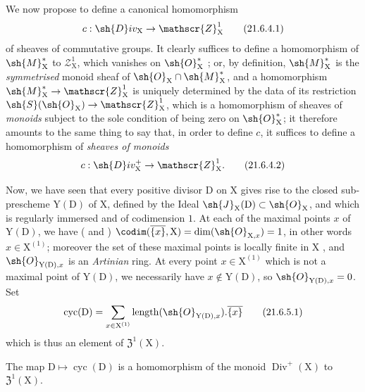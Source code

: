 \begin{env}[21.6.4]
\label{IV.21.6.4}
We now propose to define a canonical homomorphism
\[
\label{IV.21.6.4.1}
  c:\sh{D}iv_\mathrm{X}\to\mathscr{Z}_\mathrm{X}^1
  \tag{21.6.4.1}
\]
of sheaves of commutative groups.
It clearly suffices to define a homomorphism of $\sh{M}_\mathrm{X}^*$ to $\mathscr{Z}_\mathrm{X}^1$, which vanishes on $\sh{O}_\mathrm{X}^*$ ;
or, by definition, $\sh{M}_\mathrm{X}^*$ is the \emph{symmetrised} monoid sheaf of $\sh{O}_\mathrm{X}\cap\sh{M}_\mathrm{X}^*$, and a homomorphism $\sh{M}_\mathrm{X}^*\to\mathscr{Z}_\mathrm{X}^1$ is uniquely determined by the data of its restriction $\sh{S}(\sh{O}_\mathrm{X})\to\mathscr{Z}_\mathrm{X}^1$, which is a homomorphism of sheaves of \emph{monoids} subject to the sole condition of being zero on $\sh{O}_\mathrm{X}^*$;
it therefore amounts to the same thing to say that, in order to define $c$, it suffices to define a homomorphism of \emph{sheaves of monoids}
\[
\label{IV.21.6.4.2}
  c:\sh{D}iv_\mathrm{X}^+\to\mathscr{Z}_\mathrm{X}^1.
  \tag{21.6.4.2}
\]
\end{env}

\begin{env}[21.6.5]
\label{IV.21.6.5}
Now, we have seen that every positive divisor $\mathrm{D}$ on $\mathrm{X}$ gives rise to the closed sub-prescheme $\mathrm{Y}(\mathrm{D})$ of $\mathrm{X}$, defined by the Ideal $\sh{J}_\mathrm{X}(\mathrm{D})\subset\sh{O}_\mathrm{X}$, and which is regularly immersed and of codimension $1$.
At each of the maximal points $x$ of $\mathrm{Y}(\mathrm{D})$, we have ( and ) $\codim(\overline{\{x\}},\mathrm{X})=\dim(\sh{O}_{\mathrm{X},x})=1$, in other words $x\in\mathrm{X}^{(1)}$;
moreover the set of these maximal points is locally finite in $\mathrm{X}$ , and $\sh{O}_{\mathrm{Y}(\mathrm{D}),x}$ is an \emph{Artinian} ring.
At every point $x\in\mathrm{X}^{(1)}$ which is not a maximal point of $\mathrm{Y}(\mathrm{D})$, we necessarily have $x\notin\mathrm{Y}(\mathrm{D})$, so $\sh{O}_{\mathrm{Y}(\mathrm{D}),x}=0$.
Set
\[
\label{IV.21.6.5.1}
  \operatorname{cyc}(\mathrm{D})=\sum_{x\in\mathrm{X}^{(1)}}\operatorname{length}(\sh{O}_{\mathrm{Y}(\mathrm{D}),x}).\overline{\{x\}}
  \tag{21.6.5.1}
\]
which is thus an element of $\mathfrak{Z}^1(\mathrm{X})$.
\end{env}

\begin{proposition}[21.6.6]
\label{IV.21.6.6}
The map $\mathrm{D}\mapsto\operatorname{cyc}(\mathrm{D})$ is a homomorphism of the monoid $\operatorname{Div}^+(\mathrm{X})$ to $\mathfrak{Z}^1(\mathrm{X})$.
\end{proposition}

